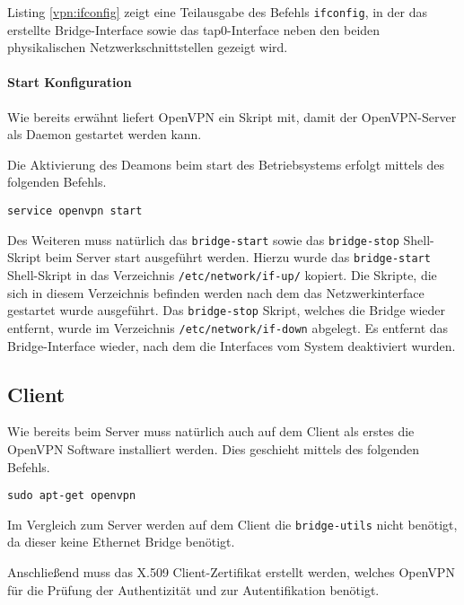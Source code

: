 

Listing \ref{vpn:ifconfig} zeigt eine Teilausgabe des Befehls \texttt{ifconfig}, in der das erstellte Bridge-Interface sowie das tap0-Interface neben den beiden physikalischen Netzwerkschnittstellen gezeigt wird.

\paragraph{Start Konfiguration}

Wie bereits erwähnt liefert OpenVPN ein Skript mit, damit der OpenVPN-Server als Daemon gestartet werden kann.

Die Aktivierung des Deamons beim start des Betriebsystems erfolgt mittels des folgenden Befehls.

\begin{lstlisting}
service openvpn start
\end{lstlisting}

Des Weiteren muss natürlich das \texttt{bridge-start} sowie das \texttt{bridge-stop} Shell-Skript beim Server start ausgeführt werden. 
Hierzu wurde das \texttt{bridge-start} Shell-Skript in das Verzeichnis \texttt{/etc/network/if-up/} kopiert. Die Skripte, die sich in diesem Verzeichnis befinden werden nach dem das Netzwerkinterface gestartet wurde ausgeführt. Das \texttt{bridge-stop} Skript, welches die Bridge wieder entfernt, wurde im Verzeichnis \texttt{/etc/network/if-down} abgelegt. Es entfernt das Bridge-Interface wieder, nach dem die Interfaces vom System deaktiviert wurden.

\subsection{Client}

Wie bereits beim Server muss natürlich auch auf dem Client als erstes die OpenVPN Software installiert werden. Dies geschieht mittels des folgenden Befehls.

\begin{lstlisting}
sudo apt-get openvpn
\end{lstlisting}

Im Vergleich zum Server werden auf dem Client die \texttt{bridge-utils} nicht benötigt, da dieser keine Ethernet Bridge benötigt.

Anschließend muss das X.509 Client-Zertifikat erstellt werden, welches OpenVPN für die Prüfung der Authentizität und zur Autentifikation benötigt.

